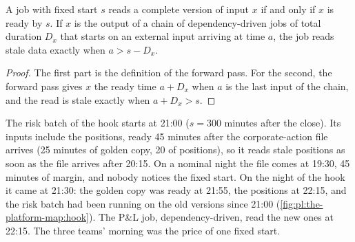 \begin{proposition}\label{prop:pl:the-platform-map:stale}
A job with fixed start $s$ reads a complete version of input $x$ if and only if $x$ is ready by $s$. If $x$ is the output of a
chain of dependency-driven jobs of total duration $D_x$ that starts on an external input arriving at time $a$, the job reads
stale data exactly when $a > s - D_x$.
\end{proposition}

\begin{proof}
The first part is the definition of the forward pass. For the second, the forward pass gives $x$ the ready time $a + D_x$ when
$a$ is the last input of the chain, and the read is stale exactly when $a + D_x > s$.
\end{proof}

The risk batch of the hook starts at 21:00 ($s = 300$ minutes after the close). Its inputs include the positions, ready 45
minutes after the corporate-action file arrives (25 minutes of golden copy, 20 of positions), so it reads stale positions as soon
as the file arrives after 20:15. On a nominal night the file comes at 19:30, 45 minutes of margin, and nobody notices the fixed
start. On the night of the hook it came at 21:30: the golden copy was ready at 21:55, the positions at 22:15, and the risk batch
had been running on the old versions since 21:00 (\cref{fig:pl:the-platform-map:hook}). The P\&L job, dependency-driven, read
the new ones at 22:15. The three teams' morning was the price of one fixed start.

\begin{omfigure}

\label{fig:pl:the-platform-map:hook}
\end{omfigure}

